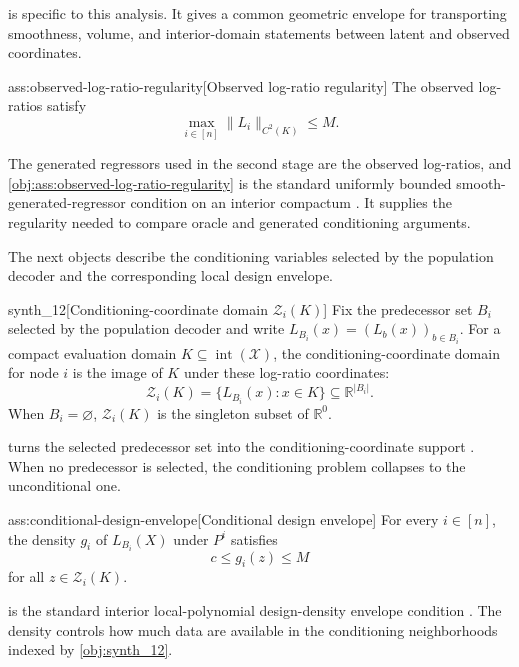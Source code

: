  is specific to this analysis. It gives a common geometric envelope for transporting smoothness, volume, and interior-domain statements between latent and observed coordinates.

\begin{assumptionv}{ass:observed-log-ratio-regularity}[Observed log-ratio regularity]
The observed log-ratios satisfy
\[
\max_{i\in[n]}\|L_i\|_{C^2(K)}\le M.
\]
\end{assumptionv}

The generated regressors used in the second stage are the observed log-ratios, and \cref{obj:ass:observed-log-ratio-regularity} is the standard uniformly bounded smooth-generated-regressor condition on an interior compactum \citep{MammenRotheSchienle2012GeneratedCovariates}. It supplies the regularity needed to compare oracle and generated conditioning arguments.

The next objects describe the conditioning variables selected by the population decoder and the corresponding local design envelope.

\begin{definitionv}{synth_12}[Conditioning-coordinate domain \(\mathcal Z_i(K)\)]
Fix the predecessor set \(B_i\) selected by the population decoder and write \(L_{B_i}(x)=(L_b(x))_{b\in B_i}\). For a compact evaluation domain \(K\subseteq\operatorname{int}(\mathcal X)\), the conditioning-coordinate domain for node \(i\) is the image of \(K\) under these log-ratio coordinates:
\[
\mathcal Z_i(K)=\{L_{B_i}(x):x\in K\}\subseteq\mathbb R^{|B_i|}.
\]
When \(B_i=\varnothing\), \(\mathcal Z_i(K)\) is the singleton subset of \(\mathbb R^0\).
\end{definitionv}

 turns the selected predecessor set  into the conditioning-coordinate support . When no predecessor is selected, the conditioning problem collapses to the unconditional one.

\begin{assumptionv}{ass:conditional-design-envelope}[Conditional design envelope]
For every \(i\in[n]\), the density \(g_i\) of \(L_{B_i}(X)\) under \(P^i\) satisfies
\[
c\le g_i(z)\le M
\]
for all \(z\in\mathcal Z_i(K)\).
\end{assumptionv}

 is the standard interior local-polynomial design-density envelope condition \citep{Xie2023UniformConditionalCDF}. The density  controls how much data are available in the conditioning neighborhoods indexed by \cref{obj:synth_12}.

